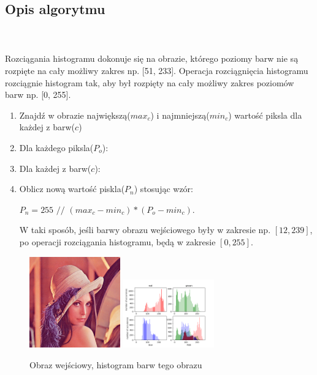 \documentclass[final,a4paper,openany,12pt]{mwbk}
\begin{document}
\subsection*{Opis algorytmu}
\hfill
\\\\
\indent  Rozciągania histogramu dokonuje się na obrazie, którego poziomy barw nie są rozpięte na cały możliwy zakres np.
[51, 233]. Operacja rozciągnięcia histogramu rozciągnie histogram tak, aby był rozpięty na cały możliwy zakres poziomów barw np. [0, 255].
\begin{enumerate}
	\item Znajdź w obrazie największą($max_c$) i najmniejszą($min_c$) wartość piksla dla każdej z barw($c$)
	\item Dla każdego piksla($P_o$):
	\item Dla każdej z barw($c$):
	\item Oblicz nową wartość piskla($P_n$) stosując wzór:\\
	\centerline{$P_n = 255$ $//$ $(max_c - min_c) * (P_o - min_c)$.}
	W taki sposób, jeśli barwy obrazu wejściowego były w zakresie
	np. $[12, 239]$, po operacji rozciągania histogramu, będą w zakresie $[0, 255]$.
\end{enumerate}

\begin{figure}[H]
	\begin{center}
		\includegraphics[width=0.35\textwidth]{lena_color}
		\includegraphics[width=0.35\textwidth]{lena_color_histogram}
	\end{center}
	\caption{Obraz wejściowy, histogram barw tego obrazu}
\end{figure}
\end{document}
